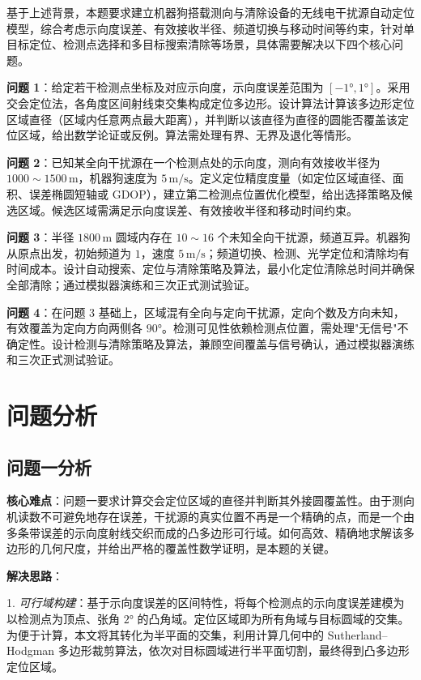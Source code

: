 \documentclass[12pt,a4paper]{ctexart}
\begin{document}
基于上述背景，本题要求建立机器狗搭载测向与清除设备的无线电干扰源自动定位模型，综合考虑示向度误差、有效接收半径、频道切换与移动时间等约束，针对单目标定位、检测点选择和多目标搜索清除等场景，具体需要解决以下四个核心问题。

\textbf{问题 1}：给定若干检测点坐标及对应示向度，示向度误差范围为 $[-1°,1°]$。采用交会定位法，各角度区间射线束交集构成定位多边形。设计算法计算该多边形定位区域直径（区域内任意两点最大距离），并判断以该直径为直径的圆能否覆盖该定位区域，给出数学论证或反例。算法需处理有界、无界及退化等情形。

\textbf{问题 2}：已知某全向干扰源在一个检测点处的示向度，测向有效接收半径为 $1000\sim1500\,\text{m}$，机器狗速度为 $5\,\text{m/s}$。定义定位精度度量（如定位区域直径、面积、误差椭圆短轴或 GDOP），建立第二检测点位置优化模型，给出选择策略及候选区域。候选区域需满足示向度误差、有效接收半径和移动时间约束。

\textbf{问题 3}：半径 $1800\,\text{m}$ 圆域内存在 $10\sim16$ 个未知全向干扰源，频道互异。机器狗从原点出发，初始频道为 $1$，速度 $5\,\text{m/s}$；频道切换、检测、光学定位和清除均有时间成本。设计自动搜索、定位与清除策略及算法，最小化定位清除总时间并确保全部清除；通过模拟器演练和三次正式测试验证。

\textbf{问题 4}：在问题 3 基础上，区域混有全向与定向干扰源，定向个数及方向未知，有效覆盖为定向方向两侧各 $90°$。检测可见性依赖检测点位置，需处理"无信号"不确定性。设计检测与清除策略及算法，兼顾空间覆盖与信号确认，通过模拟器演练和三次正式测试验证。

\section{问题分析}
\label{sec:analysis}

\subsection{问题一分析}

\textbf{核心难点}：问题一要求计算交会定位区域的直径并判断其外接圆覆盖性。由于测向机读数不可避免地存在误差，干扰源的真实位置不再是一个精确的点，而是一个由多条带误差的示向度射线交织而成的凸多边形可行域。如何高效、精确地求解该多边形的几何尺度，并给出严格的覆盖性数学证明，是本题的关键。

\textbf{解决思路}：

1. \emph{可行域构建}：基于示向度误差的区间特性，将每个检测点的示向度误差建模为以检测点为顶点、张角 $2°$ 的凸角域。定位区域即为所有角域与目标圆域的交集。为便于计算，本文将其转化为半平面的交集，利用计算几何中的 Sutherland--Hodgman 多边形裁剪算法，依次对目标圆域进行半平面切割，最终得到凸多边形定位区域。
\end{document}
